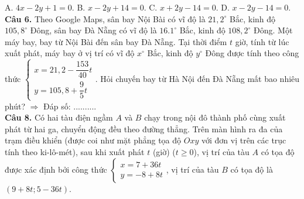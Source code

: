 \documentclass[12pt,a4paper]{extarticle}
\begin{document}
A. $4x - 2y + 1 = 0$. \hfill
B. $x - 2y + 14 = 0$. \hfill
C. $x + 2y - 14 = 0$. \hfill
D. $x - 2y - 14 = 0$.\\
\vspace{0.5cm}
\textbf{Câu 6.} Theo Google Maps, sân bay Nội Bài có vĩ độ là $21,2^\circ$ Bắc, kinh độ $105,8^\circ$ Đông, sân bay Đà Nẵng có vĩ độ là $16.1^\circ$ Bắc, kinh độ $108,2^\circ$ Đông. Một máy bay, bay từ Nội Bài đến sân bay Đà Nẵng. Tại thời điểm $t$ giờ, tính từ lúc xuất phát, máy bay ở vị trí có vĩ độ $x^\circ$ Bắc, kinh độ $y^\circ$ Đông được tính theo công thức $\begin{cases} x = 21,2 - \dfrac{153}{40}t \\ y = 105,8 + \dfrac{9}{5}t \end{cases}$. Hỏi chuyến bay từ Hà Nội đến Đà Nẵng mất bao nhiêu phút?
$\Rightarrow$ Đáp số: ..........\\
\vspace{0.5cm}
\textbf{Câu 8.} Có hai tàu điện ngầm $A$ và $B$ chạy trong nội đô thành phố cùng xuất phát từ hai ga, chuyển động đều theo đường thẳng. Trên màn hình ra đa của trạm điều khiển (được coi như mặt phẳng tọa độ $Oxy$ với đơn vị trên các trục tính theo ki-lô-mét), sau khi xuất phát $t$ (giờ) ($t \ge 0$), vị trí của tàu $A$ có tọa độ được xác định bởi công thức $\begin{cases} x = 7 + 36t \\ y = -8 + 8t \end{cases}$, vị trí của tàu $B$ có tọa độ là $(9 + 8t; 5 - 36t)$.\\
\vspace{0.5cm}
\end{document}
